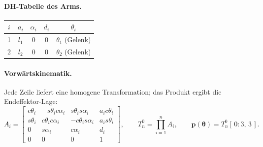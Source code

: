 \paragraph{DH-Tabelle des Arms.}
\begin{center}
\begin{tabular}{@{}ccccc@{}}
\toprule
$i$ & $a_i$ & $\alpha_i$ & $d_i$ & $\theta_i$ \\
\midrule
1 & $l_1$ & $0$ & $0$ & $\theta_1$ (Gelenk) \\
2 & $l_2$ & $0$ & $0$ & $\theta_2$ (Gelenk) \\
\bottomrule
\end{tabular}
\end{center}

\paragraph{Vorwärtskinematik.} Jede Zeile liefert eine homogene Transformation;
das Produkt ergibt die Endeffektor-Lage:
\[
A_i=\begin{bmatrix}
c\theta_i & -s\theta_i c\alpha_i & s\theta_i s\alpha_i & a_i c\theta_i\\
s\theta_i & c\theta_i c\alpha_i & -c\theta_i s\alpha_i & a_i s\theta_i\\
0 & s\alpha_i & c\alpha_i & d_i\\
0 & 0 & 0 & 1
\end{bmatrix},\qquad
T^0_n=\prod_{i=1}^{n} A_i,\qquad
\mathbf{p}(\boldsymbol\theta)=T^0_n[\,0\!:\!3,\,3\,].
\]


